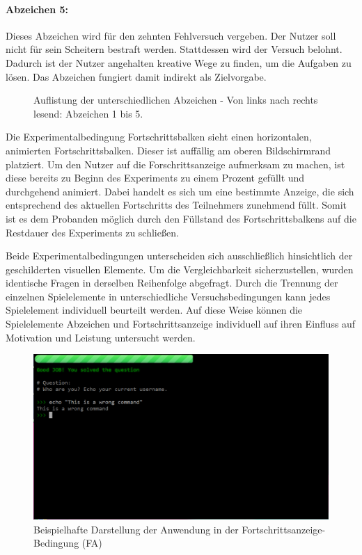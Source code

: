 \paragraph{Abzeichen 5:}
Dieses Abzeichen wird für den zehnten Fehlversuch vergeben. Der Nutzer soll nicht für sein Scheitern bestraft werden. Stattdessen wird der Versuch belohnt. Dadurch ist der Nutzer angehalten kreative Wege zu finden, um die Aufgaben zu lösen. Das Abzeichen fungiert damit indirekt als Zielvorgabe.


\begin{figure}[htbp]
    \centering
    
    
    
    
    
    \caption[Auflistung der unterschiedlichen Abzeichen]{Auflistung der unterschiedlichen Abzeichen - Von links nach rechts lesend: Abzeichen 1 bis 5.}
\end{figure}


Die Experimentalbedingung Fortschrittsbalken sieht einen horizontalen, animierten Fortschrittsbalken. Dieser ist auffällig am oberen Bildschirmrand platziert. Um den Nutzer auf die Forschrittsanzeige aufmerksam zu machen, ist diese bereits zu Beginn des Experiments zu einem Prozent gefüllt und durchgehend animiert. Dabei handelt es sich um eine bestimmte Anzeige, die sich entsprechend des aktuellen Fortschritts des Teilnehmers zunehmend füllt. Somit ist es dem Probanden möglich durch den Füllstand des Fortschrittsbalkens auf die Restdauer des Experiments zu schließen.

Beide Experimentalbedingungen unterscheiden sich ausschließlich hinsichtlich der geschilderten visuellen Elemente. Um die Vergleichbarkeit sicherzustellen, wurden identische Fragen in derselben Reihenfolge abgefragt. Durch die Trennung der einzelnen Spielelemente in unterschiedliche Versuchsbedingungen kann jedes Spielelement individuell beurteilt werden. Auf diese Weise können die Spielelemente Abzeichen und Fortschrittsanzeige individuell auf ihren Einfluss auf Motivation und Leistung untersucht werden.

\begin{figure}[htbp]
    \centering
    \includegraphics[width=\textwidth]{img/full_web.png}
    \caption{Beispielhafte Darstellung der Anwendung in der Fortschrittsanzeige-Bedingung (FA)}
\end{figure}

